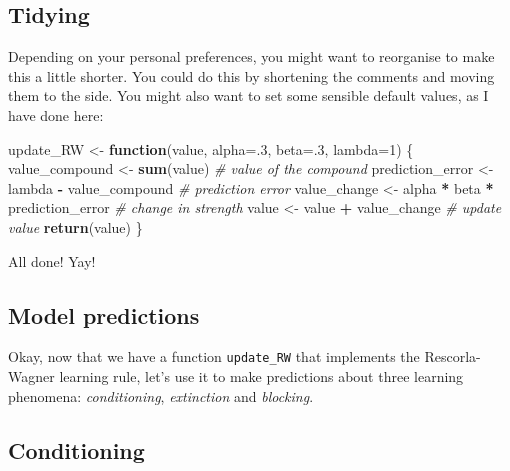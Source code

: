 \documentclass[]{book}
\newenvironment{Shaded}{\begin{snugshade}}{\end{snugshade}}
\newcommand{\CommentTok}[1]{\textcolor[rgb]{0.56,0.35,0.01}{\textit{#1}}}
\newcommand{\ControlFlowTok}[1]{\textcolor[rgb]{0.13,0.29,0.53}{\textbf{#1}}}
\newcommand{\DataTypeTok}[1]{\textcolor[rgb]{0.13,0.29,0.53}{#1}}
\newcommand{\DecValTok}[1]{\textcolor[rgb]{0.00,0.00,0.81}{#1}}
\newcommand{\KeywordTok}[1]{\textcolor[rgb]{0.13,0.29,0.53}{\textbf{#1}}}
\newcommand{\NormalTok}[1]{#1}
\newcommand{\OperatorTok}[1]{\textcolor[rgb]{0.81,0.36,0.00}{\textbf{#1}}}
\newcommand{\StringTok}[1]{\textcolor[rgb]{0.31,0.60,0.02}{#1}}
\begin{document}
\hypertarget{tidying}{%
\subsection{Tidying}\label{tidying}}

Depending on your personal preferences, you might want to reorganise to make this a little shorter. You could do this by shortening the comments and moving them to the side. You might also want to set some sensible default values, as I have done here:

\begin{Shaded}
\begin{Highlighting}[]
\NormalTok{update_RW <-}\StringTok{ }\ControlFlowTok{function}\NormalTok{(value, }\DataTypeTok{alpha=}\NormalTok{.}\DecValTok{3}\NormalTok{, }\DataTypeTok{beta=}\NormalTok{.}\DecValTok{3}\NormalTok{, }\DataTypeTok{lambda=}\DecValTok{1}\NormalTok{) \{}
\NormalTok{  value_compound <-}\StringTok{ }\KeywordTok{sum}\NormalTok{(value)                    }\CommentTok{# value of the compound }
\NormalTok{  prediction_error <-}\StringTok{ }\NormalTok{lambda }\OperatorTok{-}\StringTok{ }\NormalTok{value_compound     }\CommentTok{# prediction error}
\NormalTok{  value_change <-}\StringTok{ }\NormalTok{alpha }\OperatorTok{*}\StringTok{ }\NormalTok{beta }\OperatorTok{*}\StringTok{ }\NormalTok{prediction_error }\CommentTok{# change in strength}
\NormalTok{  value <-}\StringTok{ }\NormalTok{value }\OperatorTok{+}\StringTok{ }\NormalTok{value_change                   }\CommentTok{# update value}
  \KeywordTok{return}\NormalTok{(value)}
\NormalTok{\}}
\end{Highlighting}
\end{Shaded}

All done! Yay!

\hypertarget{model-predictions}{%
\subsection{Model predictions}\label{model-predictions}}

Okay, now that we have a function \texttt{update\_RW} that implements the Rescorla-Wagner learning rule, let's use it to make predictions about three learning phenomena: \emph{conditioning}, \emph{extinction} and \emph{blocking}.

\hypertarget{conditioning}{%
\subsection{Conditioning}\label{conditioning}}
\end{document}
